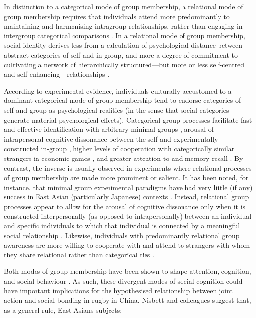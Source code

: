 \begin{CJK}{UTF8}{gbsn}
In distinction to a categorical mode of group membership, a relational mode of group membership requires that individuals attend more predominantly to maintaining and harmonising intragroup relationships, rather than engaging in intergroup categorical comparisons \citep{Yuki2003}.  In a relational mode of group membership, social identity derives less from a calculation of psychological distance between abstract categories of self and in-group, and more a degree of commitment to cultivating a network of hierarchically structured---but more or less self-centred and self-enhancing---relationships \citep{Liu2009,Nisbett2003}.

According to experimental evidence, individuals culturally accustomed to a dominant categorical mode of group membership tend to endorse categories of self and group as psychological realities (in the sense that social categories generate material psychological effects).  Categorical group processes facilitate fast and effective identification with arbitrary minimal groups \citep{Diehl1990,VanBavel2014}, arousal of intrapersonal cognitive dissonance between the self and experimentally constructed in-group \citep{Festinger1957,Stone2001}, higher levels of cooperation with categorically similar strangers in economic games \citep{Yuki2005,Yuki2003}, and greater attention to and memory recall \citep{Buchan2006,Ng2016}.  By contrast, the inverse is usually observed in experiments where relational processes of group membership are made more prominent or salient.  It has been noted, for instance, that minimal group experimental paradigms have had very little (if any) success in East Asian (particularly Japanese) contexts \citep[586]{Liu2009}.  Instead, relational group processes appear to allow for the arousal of cognitive dissonance only when it is constructed interpersonally (as opposed to intrapersonally) between an individual and specific individuals to which that individual is connected by a meaningful social relationship \citep{Hoshino-Browne2005}.  Likewise, individuals with predominantly relational group awareness are more willing to cooperate with and attend to strangers with whom they share relational rather than categorical ties \citep{Ng2016,Yuki2005}.

Both modes of group membership have been shown to shape attention, cognition, and social behaviour \citep{Nisbett2003}. As such, these divergent modes of social cognition could have important implications for the hypothesised relationship between joint action and social bonding in rugby in China.  Nisbett and colleagues suggest that, as a general rule, East Asians subjects:


\end{CJK}
